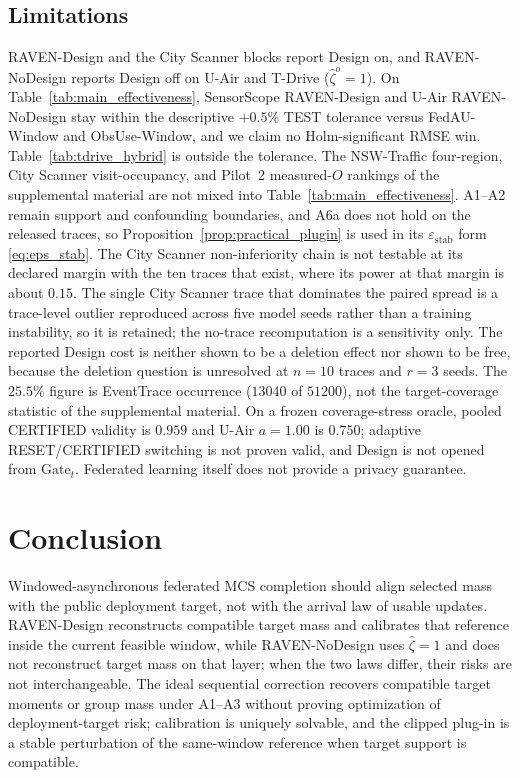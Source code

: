 \documentclass[letterpaper,journal]{IEEEtran}
\begin{document}
\subsection{Limitations}
\label{subsec:limitations}

RAVEN-Design and the City Scanner blocks report Design on, and RAVEN-NoDesign
reports Design off on U-Air and T-Drive ($\widehat\zeta^{o}=1$).  On
Table~\ref{tab:main_effectiveness}, SensorScope RAVEN-Design and U-Air
RAVEN-NoDesign stay within the descriptive $+0.5\%$ TEST tolerance versus
FedAU-Window and ObsUse-Window, and we claim no Holm-significant RMSE win.
Table~\ref{tab:tdrive_hybrid} is outside the tolerance.  The
NSW-Traffic four-region, City Scanner visit-occupancy, and Pilot~2 measured-$O$
rankings of the supplemental material are not mixed into
Table~\ref{tab:main_effectiveness}.  A1--A2 remain support and confounding
boundaries, and A6a does not hold on the released traces, so
Proposition~\ref{prop:practical_plugin} is used in its
$\varepsilon_{\mathrm{stab}}$ form \eqref{eq:eps_stab}.  The City Scanner
non-inferiority chain is not testable at its declared margin with the ten traces
that exist, where its power at that margin is about $0.15$.  The single City
Scanner trace that dominates the paired spread is a trace-level outlier
reproduced across five model seeds rather than a training instability, so it is
retained; the no-trace recomputation is a sensitivity only.  The reported
Design cost is neither shown to be a deletion effect nor shown to be free, because
the deletion question is unresolved at $n=10$ traces and $r=3$ seeds.
The $25.5\%$ figure is
EventTrace occurrence ($13040$ of $51200$), not the target-coverage statistic of
the supplemental material.  On a frozen coverage-stress oracle, pooled CERTIFIED
validity is $0.959$ and U-Air $a=1.00$ is $0.750$; adaptive RESET/CERTIFIED
switching is not proven valid, and Design is not opened from
$\mathrm{Gate}_t$.  Federated learning itself does not provide a privacy
guarantee.


\section{Conclusion}
\label{sec:conclusion}

Windowed-asynchronous federated MCS completion should align selected mass
with the public deployment target, not with the arrival law of usable
updates.  RAVEN-Design reconstructs compatible target mass and calibrates that
reference inside the current feasible window, while RAVEN-NoDesign uses
$\widehat\zeta=1$ and does not reconstruct target mass on that layer; when the
two laws differ, their risks are not interchangeable.  The ideal sequential
correction recovers compatible target moments or group mass under A1--A3 without
proving optimization of deployment-target risk; calibration is uniquely solvable,
and the clipped plug-in is a stable perturbation of the same-window reference
when target support is compatible.
\end{document}
